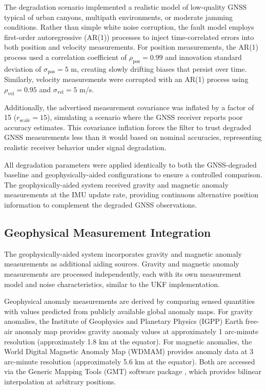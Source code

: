 \documentclass[letterpaper,times]{IONconf}
\begin{document}
The degradation scenario implemented a realistic model of low-quality GNSS typical of urban canyons, multipath environments, or moderate jamming conditions. Rather than simple white noise corruption, the fault model employs first-order autoregressive (AR(1)) processes to inject time-correlated errors into both position and velocity measurements. For position measurements, the AR(1) process used a correlation coefficient of \(\rho_{\text{pos}} = 0.99\) and innovation standard deviation of \(\sigma_{\text{pos}} = 5\) m, creating slowly drifting biases that persist over time. Similarly, velocity measurements were corrupted with an AR(1) process using \(\rho_{\text{vel}} = 0.95\) and \(\sigma_{\text{vel}} = 5\) m/s.

Additionally, the advertised measurement covariance was inflated by a factor of 15 (\(r_{\text{scale}} = 15\)), simulating a scenario where the GNSS receiver reports poor accuracy estimates. This covariance inflation forces the filter to trust degraded GNSS measurements less than it would based on nominal accuracies, representing realistic receiver behavior under signal degradation.

All degradation parameters were applied identically to both the GNSS-degraded baseline and geophysically-aided configurations to ensure a controlled comparison. The geophysically-aided system received gravity and magnetic anomaly measurements at the IMU update rate, providing continuous alternative position information to complement the degraded GNSS observations.

\subsection{Geophysical Measurement Integration}

The geophysically-aided system incorporates gravity and magnetic anomaly measurements as additional aiding sources. Gravity and magnetic anomaly measurements are processed independently, each with its own measurement model and noise characteristics, similar to the UKF implementation.

Geophysical anomaly measurements are derived by comparing sensed quantities with values predicted from publicly available global anomaly maps. For gravity anomalies, the Institute of Geophysics and Planetary Physics (IGPP) Earth free-air anomaly map \citep{EGM2008} provides gravity anomaly values at approximately 1 arc-minute resolution (approximately 1.8 km at the equator). For magnetic anomalies, the World Digital Magnetic Anomaly Map (WDMAM) \citep{wdmam} provides anomaly data at 3 arc-minute resolution (approximately 5.6 km at the equator). Both are accessed via the Generic Mapping Tools (GMT) software package \citep{GMT}, which provides bilinear interpolation at arbitrary positions.
\end{document}
